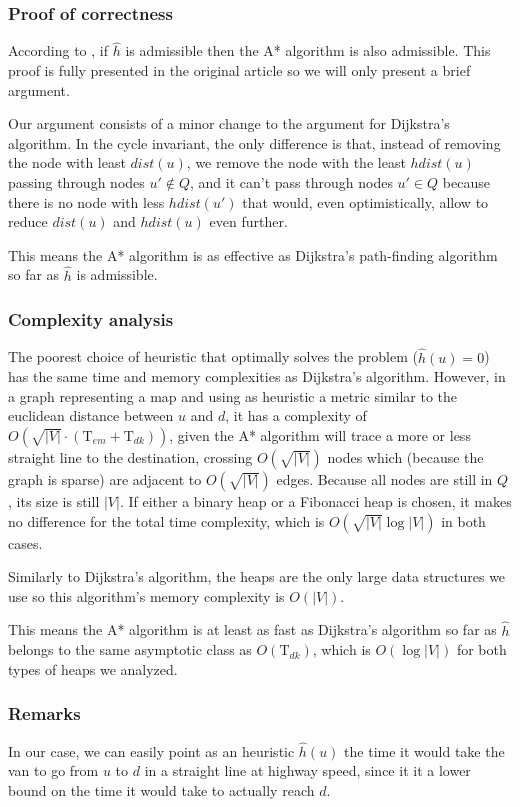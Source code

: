 \subsubsection{Proof of correctness}
According to \cite{Astar}, if $\hat{h}$ is \gls{admissible} then the A* algorithm is also \gls{admissible}. This proof is fully presented in the original article so we will only present a brief argument.\par
Our argument consists of a minor change to the argument for Dijkstra's algorithm. In the cycle invariant, the only difference is that, instead of removing the node with least $dist(u)$, we remove the node with the least $hdist(u)$ passing through nodes $u' \not \in Q$, and it can't pass through nodes $u' \in Q$ because there is no node with less $hdist(u')$ that would, even optimistically, allow to reduce $dist(u)$ and $hdist(u)$ even further.\par
This means the A* algorithm is as effective as Dijkstra's path-finding algorithm so far as $\hat{h}$ is admissible.
\subsubsection{Complexity analysis}
The poorest choice of heuristic that optimally solves the problem ($\hat{h}(u)=0$) has the same time and memory complexities as Dijkstra's algorithm. However, in a graph representing a map and using as heuristic a metric similar to the euclidean distance between $u$ and $d$, it has a complexity of $O(\sqrt{|V|} \cdot (\text{T}_{em}+\text{T}_{dk}))$, given the A* algorithm will trace a more or less straight line to the destination, crossing $O(\sqrt{|V|})$ nodes which (because the graph is sparse) are adjacent to $O(\sqrt{|V|})$ edges. Because all nodes are still in $Q$, its size is still $|V|$. If either a binary heap or a Fibonacci heap is chosen, it makes no difference for the total time complexity, which is $O(\sqrt{|V|} \log |V|)$ in both cases.\par
Similarly to Dijkstra's algorithm, the heaps are the only large data structures we use so this algorithm's memory complexity is $O(|V|)$.\par
This means the A* algorithm is at least as fast as Dijkstra's algorithm so far as $\hat{h}$ belongs to the same asymptotic class as $O(\text{T}_{dk})$, which is $O(\log |V|)$ for both types of heaps we analyzed.
\subsubsection{Remarks}
In our case, we can easily point as an heuristic $\hat{h}(u)$ the time it would take the van to go from $u$ to $d$ in a straight line at highway speed, since it it a lower bound on the time it would take to actually reach $d$.
